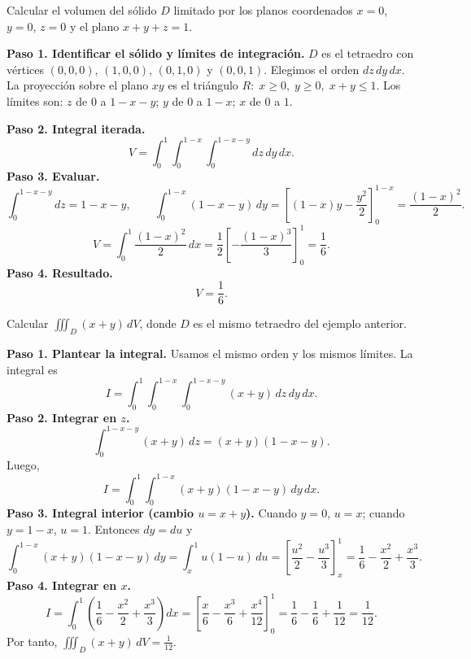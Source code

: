 \begin{example}
Calcular el volumen del sólido \(D\) limitado por los planos coordenados \(x=0\), \(y=0\), \(z=0\) y el plano \(x+y+z=1\).
\begin{myproof}
\textbf{Paso 1. Identificar el sólido y límites de integración.} $D$ es el tetraedro con vértices $(0,0,0)$, $(1,0,0)$, $(0,1,0)$ y $(0,0,1)$. Elegimos el orden $dz\,dy\,dx$. La proyección sobre el plano $xy$ es el triángulo $R:\; x\ge0,\; y\ge0,\; x+y\le1$. Los límites son: $z$ de $0$ a $1-x-y$; $y$ de $0$ a $1-x$; $x$ de $0$ a $1$.

\textbf{Paso 2. Integral iterada.}
\[
V = \int_{0}^{1}\int_{0}^{1-x}\int_{0}^{1-x-y} dz\,dy\,dx.
\]
\textbf{Paso 3. Evaluar.}
\[
\int_{0}^{1-x-y} dz = 1-x-y,\qquad
\int_{0}^{1-x}(1-x-y)\,dy
= \left[(1-x)y - \frac{y^2}{2}\right]_{0}^{1-x}
= \frac{(1-x)^2}{2}.
\]
\[
V = \int_{0}^{1} \frac{(1-x)^2}{2}\,dx
= \frac{1}{2}\left[-\frac{(1-x)^3}{3}\right]_{0}^{1}
= \frac{1}{6}.
\]
\textbf{Paso 4. Resultado.}
\[
\boxed{V = \frac{1}{6}.}
\]
\end{myproof}
\end{example}

\begin{example}
Calcular \(\iiint_D (x+y)\,dV\), donde \(D\) es el mismo tetraedro del ejemplo anterior.
\begin{myproof}
\textbf{Paso 1. Plantear la integral.} Usamos el mismo orden y los mismos límites. La integral es
\[
I = \int_{0}^{1}\int_{0}^{1-x}\int_{0}^{1-x-y} (x+y)\,dz\,dy\,dx.
\]
\textbf{Paso 2. Integrar en $z$.}
\[
\int_{0}^{1-x-y} (x+y)\,dz = (x+y)(1-x-y).
\]
Luego,
\[
I = \int_{0}^{1}\int_{0}^{1-x} (x+y)(1-x-y)\,dy\,dx.
\]
\textbf{Paso 3. Integral interior (cambio $u=x+y$).} Cuando \(y=0\), \(u=x\); cuando \(y=1-x\), \(u=1\). Entonces \(dy=du\) y
\[
\int_{0}^{1-x} (x+y)(1-x-y)\,dy
= \int_{x}^{1} u(1-u)\,du
= \left[\frac{u^2}{2} - \frac{u^3}{3}\right]_{x}^{1}
= \frac{1}{6} - \frac{x^2}{2} + \frac{x^3}{3}.
\]
\textbf{Paso 4. Integrar en $x$.}
\[
I = \int_{0}^{1} \left(\frac{1}{6} - \frac{x^2}{2} + \frac{x^3}{3}\right) dx
= \left[\frac{x}{6} - \frac{x^3}{6} + \frac{x^4}{12}\right]_{0}^{1}
= \frac{1}{6} - \frac{1}{6} + \frac{1}{12}
= \frac{1}{12}.
\]
Por tanto, \(\boxed{\iiint_D (x+y)\,dV = \frac{1}{12}}\).
\end{myproof}
\end{example}

